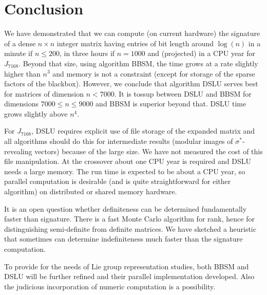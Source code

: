 \documentclass{acm_proc_article-sp}
\newcommand{\signature}{\ensuremath{\sigma^{*}}}
\begin{document}

%

\section{Conclusion} %
We have demonstrated that we can compute (on current hardware) the signature 
of a dense $n\times n$ integer matrix having entries of bit length around $\log(n)$ 
in a minute if $n \leq 200$, in three hours if $n = 1000$ and (projected) in a CPU year 
for $J_{7168}$.  Beyond that size, using algorithm BBSM, the time 
grows at a rate slightly higher than $n^3$ and memory is not a constraint 
(except for storage of the sparse factors of the blackbox).
However, we conclude that algorithm DSLU serves best for matrices of dimension $n < 7000$. 
It is tossup between DSLU and BBSM for dimensions $7000 \leq n \leq 9000$ and BBSM is
superior beyond that.  
DSLU time grows slightly above $n^4$.

For $J_{7168}$, DSLU requires explicit use of file storage of the expanded matrix
and all algorithms should do this for intermediate results 
(modular images of \signature-revealing vectors) because of the large size.
We have not measured the cost of this file manipulation.
At the crossover about one CPU year is required and DSLU needs a large memory.
The run time is expected to be about a CPU year, so 
parallel computation is desirable 
(and is quite straightforward for either algorithm)
on distributed or shared memory hardware.

It is an open question whether definiteness can be determined fundamentally faster than
signature.  There is a fast Monte Carlo algorithm for rank, hence for distinguishing
semi-definite from definite matrices.  We have sketched a heuristic that sometimes 
can determine indefiniteness much faster than the signature computation.

To provide for the needs of Lie group representation studies, both BBSM and DSLU will 
be further refined and their parallel implementation developed.  Also the judicious 
incorporation of numeric computation is a possibility.





\end{document}
